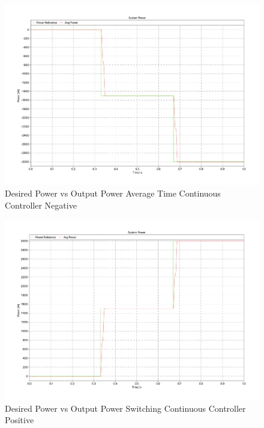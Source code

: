 \documentclass[12pt]{article}
\begin{document}
\begin{figure}[ht]
    \centering{}
    \includegraphics[width=\textwidth, height=0.4\textheight, keepaspectratio]{img/Average Time C Power Negative.pdf}
    \caption{Desired Power vs Output Power Average Time Continuous Controller Negative}
    \label{fig:avg-time-c-power-negative}
\end{figure}

\begin{figure}[ht]
    \centering{}
    \includegraphics[width=\textwidth, height=0.4\textheight, keepaspectratio]{img/Switching C Power Positive.pdf}
    \caption{Desired Power vs Output Power Switching Continuous Controller Positive}
    \label{fig:switching-c-power-positive}
\end{figure}
\end{document}
